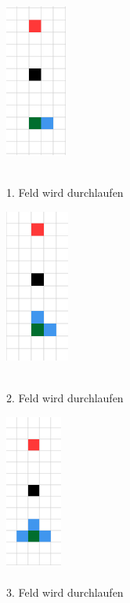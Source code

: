 {{{{			\begin{figure}[H]
				\begin{minipage}{0.5\textwidth}
					\centering
					\includegraphics[height=5cm]{Bilder/pathfinding_procedure_1.png}
					\caption{\\ 1. Feld wird durchlaufen} 
					\label{pic:pathfinding_procedure_1}
				\end{minipage}
				\begin{minipage}{0.5\textwidth}
					\centering
					\includegraphics[height=5cm]{Bilder/pathfinding_procedure_2.png}
					\caption{\\ 2. Feld wird durchlaufen} 
					\label{pic:pathfinding_procedure_2}
				\end{minipage}
				\newline
				\begin{minipage}{0.5\textwidth}
					\centering
					\includegraphics[height=5cm]{Bilder/pathfinding_procedure_3.png}
					\caption{\\ 3. Feld wird durchlaufen} 
					\label{pic:pathfinding_procedure_3}

\end{minipage}
\end{figure}}}}}
